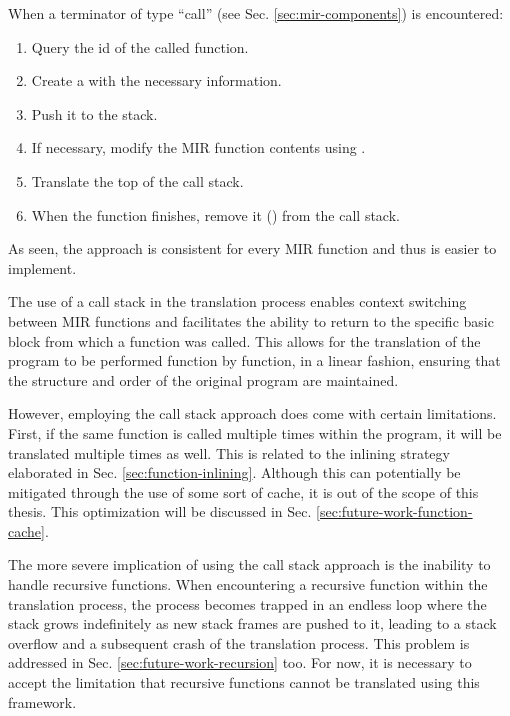 When a terminator of type ``call'' (see Sec. \ref{sec:mir-components}) is encountered:

\begin{enumerate}
    \item Query the id of the called function.
    \item Create a  with the necessary information.
    \item Push it to the stack.
    \item If necessary, modify the \acrshort{MIR} function contents using .
    \item Translate the top of the call stack.
    \item When the function finishes, remove it () from the call stack.
\end{enumerate}

As seen, the approach is consistent for every \acrshort{MIR} function
and thus is easier to implement.

The use of a call stack in the translation process enables context switching
between \acrshort{MIR} functions and facilitates the ability to return to the specific basic block
from which a function was called.
This allows for the translation of the program to be performed function by function,
in a linear fashion, ensuring that the structure and order of the original program are maintained.

However, employing the call stack approach does come with certain limitations.
First, if the same function is called multiple times within the program,
it will be translated multiple times as well.
This is related to the inlining strategy elaborated in Sec. \ref{sec:function-inlining}.
Although this can potentially be mitigated through the use of some sort of cache,
it is out of the scope of this thesis.
This optimization will be discussed in Sec. \ref{sec:future-work-function-cache}.

The more severe implication of using the call stack approach
is the inability to handle recursive functions.
When encountering a recursive function within the translation process,
the process becomes trapped in an endless loop
where the stack grows indefinitely as new stack frames are pushed to it,
leading to a stack overflow and a subsequent crash of the translation process.
This problem is addressed in Sec. \ref{sec:future-work-recursion} too.
For now, it is necessary to accept the limitation that recursive functions
cannot be translated using this framework.

